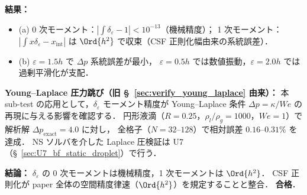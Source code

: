 \noindent\textbf{結果：}
\begin{itemize}[noitemsep]
  \item (a) 0 次モーメント：$|\int \delta_\varepsilon - 1| < 10^{-13}$（機械精度）；
        1 次モーメント：$|\int x\delta_\varepsilon - x_\mathrm{int}|$ は
        $\Ord{h^2}$ で収束（CSF 正則化幅由来の系統誤差）．
  \item (b) $\varepsilon = 1.5h$ で $\Delta p$ 系統誤差が最小，
        $\varepsilon = 0.5h$ では数値振動，$\varepsilon = 2.0h$ では過剰平滑化が支配．
\end{itemize}

\medskip
\noindent\textbf{Young--Laplace 圧力跳び（旧 §~\ref{sec:verify_young_laplace} 由来）：}
\label{sec:verify_young_laplace}
本 sub-test の応用として，$\delta_\varepsilon$ モーメント精度が
Young--Laplace 条件 $\Delta p = \kappa/\mathit{We}$ の再現に与える影響を確認する．
円形液滴（$R = 0.25$，$\rho_l/\rho_g = 1000$，$\mathit{We} = 1$）で
解析解 $\Delta p_\mathrm{exact} = 4.0$ に対し，
全格子（$N = 32$--$128$）で相対誤差 $0.16$--$0.31\%$ を達成．
NS ソルバを介した Laplace 圧検証は U7（§~\ref{sec:U7_bf_static_droplet}）で行う．

\noindent\textbf{結論：}
$\delta_\varepsilon$ の 0 次モーメントは機械精度，1 次モーメントは $\Ord{h^2}$．
CSF 正則化が paper 全体の空間精度律速（$\Ord{h^2}$）を規定することと整合．
\textbf{合格}．
